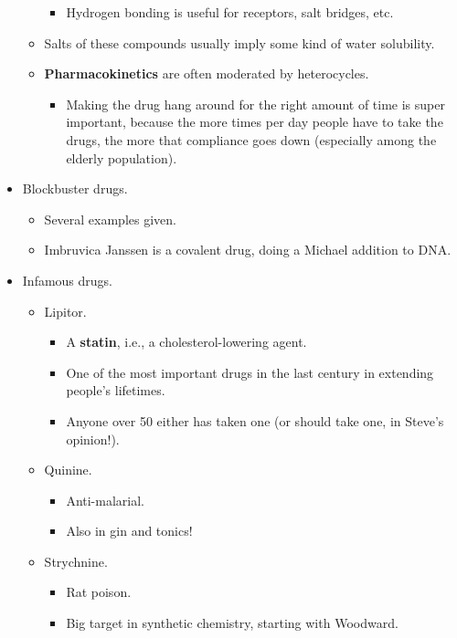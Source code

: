 \documentclass[../notes.tex]{subfiles}
\begin{document}
\begin{itemize}
\begin{itemize}
\begin{itemize}
            \item Hydrogen bonding is useful for receptors, salt bridges, etc.
        \end{itemize}
        \item Salts of these compounds usually imply some kind of water solubility.
        \item \textbf{Pharmacokinetics} are often moderated by heterocycles.
        \begin{itemize}
            \item Making the drug hang around for the right amount of time is super important, because the more times per day people have to take the drugs, the more that compliance goes down (especially among the elderly population).
        \end{itemize}
    \end{itemize}
    \item Blockbuster drugs.
    \begin{itemize}
        \item Several examples given.
        \item Imbruvica Janssen is a covalent drug, doing a Michael addition to DNA.
    \end{itemize}
    \item Infamous drugs.
    \begin{itemize}
        \item Lipitor.
        \begin{itemize}
            \item A \textbf{statin}, i.e., a cholesterol-lowering agent.
            \item One of the most important drugs in the last century in extending people's lifetimes.
            \item Anyone over 50 either has taken one (or should take one, in Steve's opinion!).
        \end{itemize}
        \item Quinine.
        \begin{itemize}
            \item Anti-malarial.
            \item Also in gin and tonics!
        \end{itemize}
        \item Strychnine.
        \begin{itemize}
            \item Rat poison.
            \item Big target in synthetic chemistry, starting with Woodward.

\end{itemize}
\end{itemize}
\end{itemize}
\end{document}

